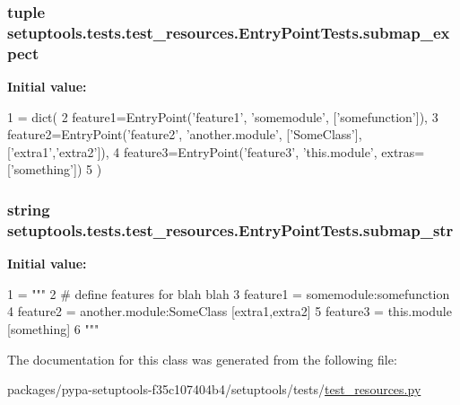 \subsubsection[{submap\+\_\+expect}]{\setlength{\rightskip}{0pt plus 5cm}tuple setuptools.\+tests.\+test\+\_\+resources.\+Entry\+Point\+Tests.\+submap\+\_\+expect\hspace{0.3cm}{\ttfamily [static]}}\label{classsetuptools_1_1tests_1_1test__resources_1_1EntryPointTests_ad376c636981ea14bd55bb047557edc2f}
{\bfseries Initial value\+:}
\begin{DoxyCode}
1 = dict(
2         feature1=EntryPoint(\textcolor{stringliteral}{'feature1'}, \textcolor{stringliteral}{'somemodule'}, [\textcolor{stringliteral}{'somefunction'}]),
3         feature2=EntryPoint(\textcolor{stringliteral}{'feature2'}, \textcolor{stringliteral}{'another.module'}, [\textcolor{stringliteral}{'SomeClass'}], [\textcolor{stringliteral}{'extra1'},\textcolor{stringliteral}{'extra2'}]),
4         feature3=EntryPoint(\textcolor{stringliteral}{'feature3'}, \textcolor{stringliteral}{'this.module'}, extras=[\textcolor{stringliteral}{'something'}])
5     )
\end{DoxyCode}
\hypertarget{classsetuptools_1_1tests_1_1test__resources_1_1EntryPointTests_a3357c7d6852c89742abb51a04e4a982e}{}
\subsubsection[{submap\+\_\+str}]{\setlength{\rightskip}{0pt plus 5cm}string setuptools.\+tests.\+test\+\_\+resources.\+Entry\+Point\+Tests.\+submap\+\_\+str\hspace{0.3cm}{\ttfamily [static]}}\label{classsetuptools_1_1tests_1_1test__resources_1_1EntryPointTests_a3357c7d6852c89742abb51a04e4a982e}
{\bfseries Initial value\+:}
\begin{DoxyCode}
1 = \textcolor{stringliteral}{"""}
2 \textcolor{stringliteral}{        # define features for blah blah}
3 \textcolor{stringliteral}{        feature1 = somemodule:somefunction}
4 \textcolor{stringliteral}{        feature2 = another.module:SomeClass [extra1,extra2]}
5 \textcolor{stringliteral}{        feature3 = this.module [something]}
6 \textcolor{stringliteral}{"""}
\end{DoxyCode}


The documentation for this class was generated from the following file\+:\begin{DoxyCompactItemize}
\item 
packages/pypa-\/setuptools-\/f35c107404b4/setuptools/tests/\hyperlink{test__resources_8py}{test\+\_\+resources.\+py}\end{DoxyCompactItemize}
